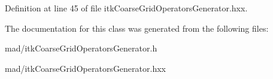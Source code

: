 Definition at line 45 of file itk\-Coarse\-Grid\-Operators\-Generator.\-hxx.



The documentation for this class was generated from the following files\-:\begin{DoxyCompactItemize}
\item 
mad/itk\-Coarse\-Grid\-Operators\-Generator.\-h\item 
mad/itk\-Coarse\-Grid\-Operators\-Generator.\-hxx\end{DoxyCompactItemize}
